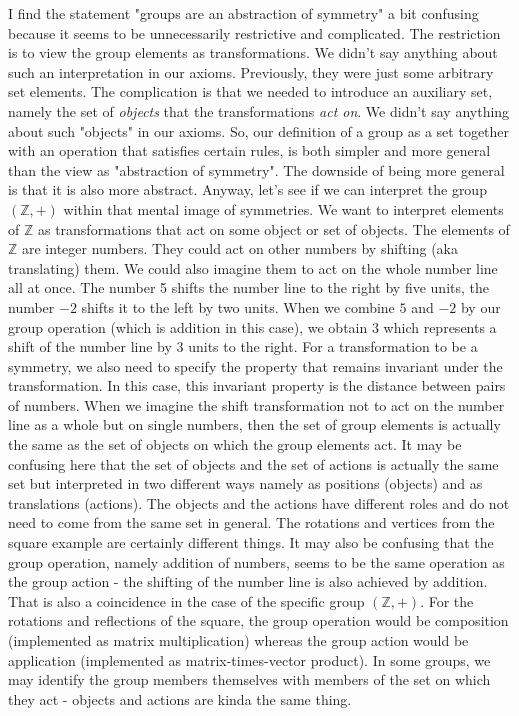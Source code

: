 \medskip
I find the statement "groups are an abstraction of symmetry" a bit confusing because it seems to be unnecessarily restrictive and complicated. The restriction is to view the group elements as transformations. We didn't say anything about such an interpretation in our axioms. Previously, they were just some arbitrary set elements. The complication is that we needed to introduce an auxiliary set, namely the set of \emph{objects} that the transformations \emph{act on}. We didn't say anything about such "objects" in our axioms. So, our definition of a group as a set together with an operation that satisfies certain rules, is both simpler and more general than the view as "abstraction of symmetry". The downside of being more general is that it is also more abstract. Anyway, let's see if we can interpret the group $(\mathbb{Z},+)$ within that mental image of symmetries. We want to interpret elements of $\mathbb{Z}$ as transformations that act on some object or set of objects. The elements of $\mathbb{Z}$ are integer numbers. They could act on other numbers by shifting (aka translating) them. We could also imagine them to act on the whole number line all at once. The number 5 shifts the number line to the right by five units, the number $-2$ shifts it to the left by two units. When we combine $5$ and $-2$ by our group operation (which is addition in this case), we obtain $3$ which represents a shift of the number line by $3$ units to the right. For a transformation to be a symmetry, we also need to specify the property that remains invariant under the transformation. In this case, this invariant property is the distance between pairs of numbers. When we imagine the shift transformation not to act on the number line as a whole but on single numbers, then the set of group elements is actually the same as the set of objects on which the group elements act. It may be confusing here that the set of objects and the set of actions is actually the same set but interpreted in two different ways namely as positions (objects) and as translations (actions). The objects and the actions have different roles and do not need to come from the same set in general. The rotations and vertices from the square example are certainly different things. It may also be confusing that the group operation, namely addition of numbers, seems to be the same operation as the group action - the shifting of the number line is also achieved by addition. That is also a coincidence in the case of the specific group $(\mathbb{Z},+)$. For the rotations and reflections of the square, the group operation would be composition (implemented as matrix multiplication) whereas the group action would be application (implemented as matrix-times-vector product). In some groups, we may identify the group members themselves with members of the set on which they act - objects and actions are kinda the same thing. 


